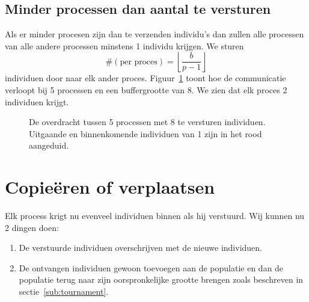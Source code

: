 \subsection{Minder processen dan aantal te versturen}
Als er minder procesen zijn dan te verzenden individu's dan zullen alle processen van alle andere processen minstens 1 individu krijgen. We sturen \[
\#(\text{per proces}) = \left\lfloor \frac{b}{p-1} \right\rfloor
\] individuen door naar elk ander proces.
Figuur~\ref{parr_conn_5} toont hoe de communicatie verloopt bij 5 processen en een buffergrootte van 8. We zien dat elk proces 2 individuen krijgt.
\begin{figure}[H]
\centering
{}
\caption{De overdracht tussen 5 processen met 8 te versturen individuen. Uitgaande en binnenkomende individuen van 1 zijn in het rood aangeduid.}
\label{parr_conn_5}
\end{figure}

\section{Copieëren of verplaatsen}
Elk process krigt nu evenveel individuen binnen als hij verstuurd. Wij kunnen nu 2 dingen doen:
\begin{enumerate}
	\item De verstuurde individuen overschrijven met de nieuwe individuen.
	\item De ontvangen individuen gewoon toevoegen aan de populatie en dan de populatie terug naar zijn oorspronkelijke grootte brengen zoals beschreven in sectie~\ref{sub:tournament}.
\end{enumerate}

